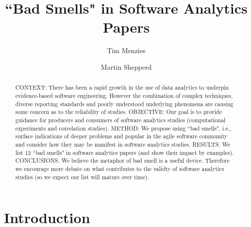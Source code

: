 \documentclass[10pt]{elsarticle}
\newcommand{\RRED}{\color{red}}
\newcommand{\BLACK}{\color{black}}
\begin{document}

\title{``Bad Smells" in Software Analytics Papers}
\author{Tim Menzies}
\address{Dept.\ of Computer Science\\North Carolina State University, USA}
\author{Martin Shepperd}
\address{Brunel Software Engineering Lab (BSEL)\\Dept.\ of Computer Science\\Brunel University London\\ UB8 3PH, UK}


\begin{abstract}
CONTEXT:  There has been a rapid growth in the use of data analytics to underpin evidence-based software engineering.  However the combination of complex techniques, diverse reporting standards and poorly understood underlying phenomena are causing some concern as to the reliability of studies.\newline
OBJECTIVE: Our goal is to provide guidance for producers and consumers of software analytics studies (computational experiments and correlation studies).\newline
METHOD: We propose using ``bad smells", i.e., surface indications of deeper problems and popular in the agile software community and consider how they may be manifest in software analytics studies.\newline
RESULTS: We  list 12 ``bad smells" in software analytics papers (and show their impact by examples).\newline 
CONCLUSIONS: \RRED We believe the metaphor of bad smell is a useful device. Therefore we encourage more debate on what contributes to the validty of software analytics studies \BLACK (so we expect our list will mature over time).
\end{abstract}


\maketitle

\section{Introduction}
\end{document}
